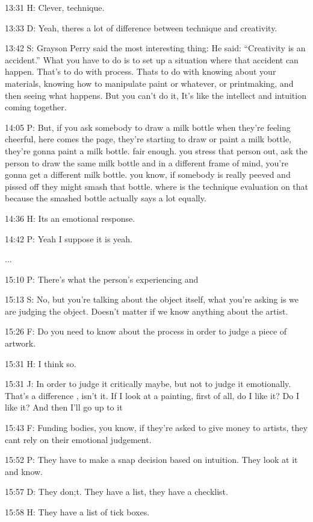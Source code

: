 13:31 H: Clever, technique.

13:33 D: Yeah, theres a lot of difference between technique and creativity.

13:42 S: Grayson Perry said the most interesting thing: He said: ``Creativity is an accident.'' What you have to do is to set up a situation where that accident can happen. That's to do with process. Thats to do with knowing about your materials, knowing how to manipulate paint or whatever, or printmaking, and then seeing what happens. But you can't do it, It's like the intellect and intuition coming together.

14:05 P: But, if you ask somebody to draw a milk bottle when they're feeling cheerful, here comes the page, they're starting to draw or paint a milk bottle, they're gonna paint a milk bottle. fair enough. you stress that person out, ask the person to draw the same milk bottle and in a different frame of mind, you're gonna get a different milk bottle. you know, if somebody is really peeved and pissed off they might smash that bottle. where is the technique evaluation on that because the smashed bottle actually says a lot equally.

14:36 H: Its an emotional response.

14:42 P: Yeah I suppose it is yeah.

...

15:10 P: There's what the person's experiencing and

15:13 S: No, but you're talking about the object itself, what you're asking is we are judging the object. Doesn't matter if we know anything about the artist.

15:26 F: Do you need to know about the process in order to judge a piece of artwork.

15:31 H: I think so.

15:31 J: In order to judge it critically maybe, but not to judge it emotionally. That's a difference , isn't it. If I look at a painting, first of all, do I like it? Do I like it? And then I'll go up to it

15:43 F: Funding bodies, you know, if they're asked to give money to artists, they cant rely on their emotional judgement.

15:52 P: They have to make a snap decision based on intuition. They look at it and know.

15:57 D: They don;t. They have a list, they have a checklist.

15:58 H: They have a list of tick boxes.

